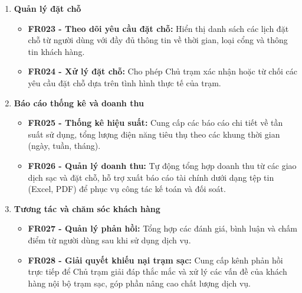 \begin{enumerate}[label=\textbf{\alph*)}]
\begin{itemize}
 \end{itemize}
 \item \textbf{Quản lý đặt chỗ}
 \begin{itemize}
    \item \textbf{FR023 - Theo dõi yêu cầu đặt chỗ:} Hiển thị danh sách các lịch đặt chỗ từ người dùng với đầy đủ thông tin về thời gian, loại cổng và thông tin khách hàng.
    \item \textbf{FR024 - Xử lý đặt chỗ:} Cho phép Chủ trạm xác nhận hoặc từ chối các yêu cầu đặt chỗ dựa trên tình hình thực tế của trạm.
 \end{itemize}
 \item \textbf{Báo cáo thống kê và doanh thu}
 \begin{itemize}
    \item \textbf{FR025 - Thống kê hiệu suất:} Cung cấp các báo cáo chi tiết về tần suất sử dụng, tổng lượng điện năng tiêu thụ theo các khung thời gian (ngày, tuần, tháng).
    \item \textbf{FR026 - Quản lý doanh thu:} Tự động tổng hợp doanh thu từ các giao dịch sạc và đặt chỗ, hỗ trợ xuất báo cáo tài chính dưới dạng tệp tin (Excel, PDF) để phục vụ công tác kế toán và đối soát.
 \end{itemize}
 \item \textbf{Tương tác và chăm sóc khách hàng}
 \begin{itemize}
    \item \textbf{FR027 - Quản lý phản hồi:} Tổng hợp các đánh giá, bình luận và chấm điểm từ người dùng sau khi sử dụng dịch vụ.
    \item \textbf{FR028 - Giải quyết khiếu nại trạm sạc:} Cung cấp kênh phản hồi trực tiếp để Chủ trạm giải đáp thắc mắc và xử lý các vấn đề của khách hàng nội bộ trạm sạc, góp phần nâng cao chất lượng dịch vụ.
 \end{itemize}
\end{enumerate}


